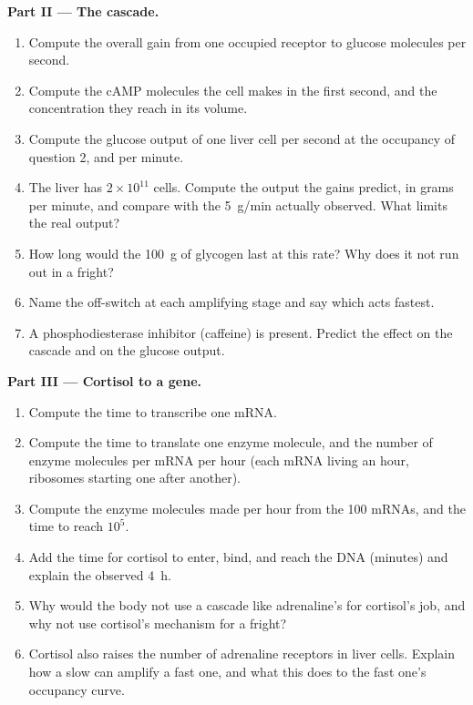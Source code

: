 \begin{problem}
\medskip
\noindent\textbf{Part II --- The cascade.}
\begin{enumerate}[resume]
  \item Compute the overall gain from one occupied receptor to
        glucose molecules per second.
  \item Compute the cAMP molecules the cell makes in the first
        second, and the concentration they reach in its volume.
  \item Compute the glucose output of one liver cell per second at
        the occupancy of question 2, and per minute.
  \item The liver has $2\times 10^{11}$ cells. Compute the output
        the gains predict, in grams per minute, and compare with the
        \qty{5}{g/min} actually observed. What limits the real
        output?
  \item How long would the \qty{100}{g} of glycogen last at this
        rate? Why does it not run out in a fright?
  \item Name the off-switch at each amplifying stage and say which
        acts fastest.
  \item A phosphodiesterase inhibitor (caffeine) is present. Predict
        the effect on the cascade and on the glucose output.
\end{enumerate}

\medskip
\noindent\textbf{Part III --- Cortisol to a gene.}
\begin{enumerate}[resume]
  \item Compute the time to transcribe one mRNA.
  \item Compute the time to translate one enzyme molecule, and the
        number of enzyme molecules per mRNA per hour (each mRNA
        living an hour, ribosomes starting one after another).
  \item Compute the enzyme molecules made per hour from the
        \num{100} mRNAs, and the time to reach $10^{5}$.
  \item Add the time for cortisol to enter, bind, and reach the DNA
        (minutes) and explain the observed \qty{4}{h}.
  \item Why would the body not use a cascade like adrenaline's for
        cortisol's job, and why not use cortisol's mechanism for a
        fright?
  \item Cortisol also raises the number of adrenaline receptors in
        liver cells. Explain how a slow  can amplify a fast
        one, and what this does to the fast one's occupancy curve.
\end{enumerate}


\end{problem}
